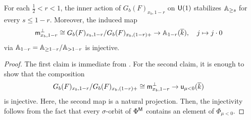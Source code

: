 \documentclass[12pt,reqno]{amsart}
\begin{document}
\begin{cor} \label{cor:orbit_injectivity}
    For each $\tfrac{1}{2} < r < 1$, the inner action of $G_b(F)_{x_b, 1 - r}$ on ${\mathsf{U}}(1)$ stabilizes $\mathbb{A}_{\geq s}$ for every $s \leq 1 - r$. Moreover, the induced map
    \[
        {\mathsf{m}}^\perp_{x_b, 1 - r} \cong G_b(F)_{x_b, 1 - r} / G_b(F)_{x_b, (1 - r)+} \to \mathbb{A}_{1 - r}({\overline{k}}) ,\quad j \mapsto j \cdot 0
    \]
    via $\mathbb{A}_{1 - r} = \mathbb{A}_{\geq 1 - r} / \mathbb{A}_{> 1 - r}$ is injective. 
\end{cor}
\begin{proof}
    The first claim is immediate from . For the second claim, it is enough to show that the composition
    \[
        G_b(F)_{x_b, 1 - r} / G_b(F)_{x_b, (1 - r)+} \cong {\mathsf{m}}^\perp_{x_b, 1 - r} \to {\mathsf{u}}_{\mu < 0}({\overline{k}})
    \]
    is injective. Here, the second map is a natural projection. Then, the injectivity follows from the fact that every $\sigma$-orbit of $\Phi^{{\mathsf{M}}}$ contains an element of $\Phi_{\mu < 0}$. 
\end{proof}
\end{document}
